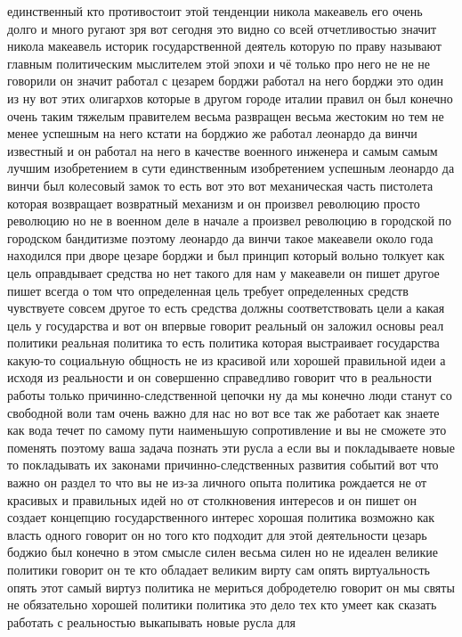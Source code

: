 единственный
кто противостоит этой тенденции никола макеавель его очень долго и много ругают
зря вот сегодня это видно со всей отчетливостью значит никола макеавель историк
государственной деятель которую по праву называют главным политическим
мыслителем этой эпохи и чё только про него не не не говорили он значит работал с
цезарем борджи работал на него борджи это один из ну вот этих олигархов которые
в другом городе италии правил он был конечно очень таким тяжелым правителем
весьма развращен весьма жестоким но тем не менее успешным на него кстати на
борджио же работал леонардо да винчи известный и он работал на него в качестве
военного инженера и самым самым лучшим изобретением в сути единственным
изобретением успешным леонардо да винчи был колесовый замок то есть вот это вот
механическая часть пистолета которая возвращает возвратный механизм и он
произвел революцию просто революцию но не в военном деле в начале а произвел
революцию в городской по городском бандитизме поэтому леонардо да винчи такое
макеавели около года находился при дворе цезаре борджи и был принцип который
вольно толкует как цель оправдывает средства но нет такого для нам у макеавели
он пишет другое пишет всегда о том что определенная цель требует определенных
средств чувствуете совсем другое то есть средства должны соответствовать цели а
какая цель у государства и вот он впервые говорит реальный он заложил основы
реал политики реальная политика то есть политика которая выстраивает государства
какую-то социальную общность не из красивой или хорошей правильной идеи а исходя
из реальности и он совершенно справедливо говорит что в реальности работы только
причинно-следственной цепочки ну да мы конечно люди станут со свободной воли там
очень важно для нас но вот все так же работает как знаете как вода течет по
самому пути наименьшую сопротивление и вы не сможете это поменять поэтому ваша
задача познать эти русла а если вы и покладываете новые то покладывать их
законами причинно-следственных развития событий вот что важно он раздел то что
вы не из-за личного опыта политика рождается не от красивых и правильных идей но
от столкновения интересов и он пишет он создает концепцию государственного
интерес хорошая политика возможно как власть одного говорит он но того кто
подходит для этой деятельности цезарь боджио был конечно в этом смысле силен
весьма силен но не идеален великие политики говорит он те кто обладает великим
вирту сам опять виртуальность опять этот самый виртуз политика не мериться
добродетелю говорит он мы святы не обязательно хорошей политики политика это
дело тех кто умеет как сказать работать с реальностью выкапывать новые русла для
